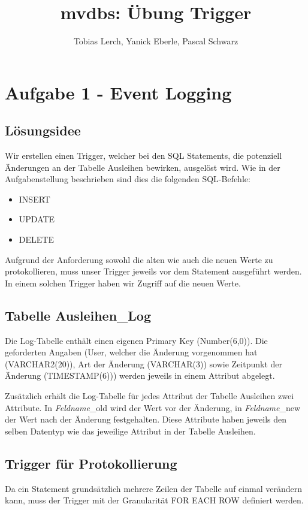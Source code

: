 \documentclass[11pt,a4paper,parskip=half]{scrartcl}
\title{mvdbs: Übung Trigger}
\author{Tobias Lerch, Yanick Eberle, Pascal Schwarz}
\begin{document}
\maketitle

\section{Aufgabe 1 - Event Logging}
\subsection{Lösungsidee}
Wir erstellen einen Trigger, welcher bei den SQL Statements, die potenziell Änderungen an der Tabelle \glqq{}Ausleihen\grqq{} bewirken, ausgelöst wird. Wie in der Aufgabenstellung beschrieben sind dies die folgenden SQL-Befehle:

\begin{itemize}
	\item{INSERT}
	\item{UPDATE}
	\item{DELETE}
\end{itemize}

Aufgrund der Anforderung sowohl die alten wie auch die neuen Werte zu protokollieren, muss unser Trigger jeweils vor dem Statement ausgeführt werden. In einem solchen Trigger haben wir Zugriff auf die neuen Werte.

\subsection{Tabelle Ausleihen\_Log}
Die Log-Tabelle enthält einen eigenen Primary Key (Number(6,0)). Die geforderten Angaben (User, welcher die Änderung vorgenommen hat (VARCHAR2(20)), Art der Änderung (VARCHAR(3)) sowie Zeitpunkt der Änderung (TIMESTAMP(6))) werden jeweils in einem Attribut abgelegt.

Zusätzlich erhält die Log-Tabelle für jedes Attribut der Tabelle Ausleihen zwei Attribute. In \emph{Feldname}\_old wird der Wert vor der Änderung, in \emph{Feldname}\_new der Wert nach der Änderung festgehalten. Diese Attribute haben jeweils den selben Datentyp wie das jeweilige Attribut in der Tabelle \glqq{}Ausleihen\grqq{}.

\subsection{Trigger für Protokollierung}
Da ein Statement grundsätzlich mehrere Zeilen der Tabelle \glqq{}auf einmal\grqq{} verändern kann, muss der Trigger mit der Granularität \glqq{}FOR EACH ROW\grqq{} definiert werden.
\end{document}
